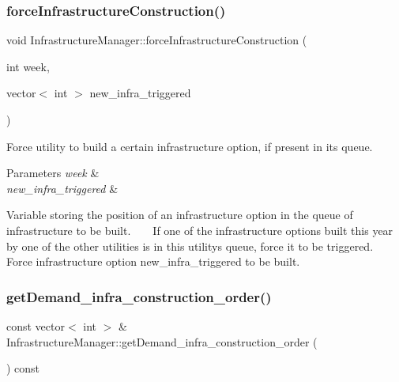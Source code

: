 \mbox{\label{classInfrastructureManager_aaa79bdb84fc23597c4a8b3776dc26f5d}} 
\subsubsection{\texorpdfstring{force\+Infrastructure\+Construction()}{forceInfrastructureConstruction()}}
{\footnotesize\ttfamily void Infrastructure\+Manager\+::force\+Infrastructure\+Construction (\begin{DoxyParamCaption}\item[{int}]{week,  }\item[{vector$<$ int $>$}]{new\+\_\+infra\+\_\+triggered }\end{DoxyParamCaption})}

Force utility to build a certain infrastructure option, if present in its queue. 
\begin{DoxyParams}{Parameters}
{\em week} & \\
\hline
{\em new\+\_\+infra\+\_\+triggered} & \\
\hline
\end{DoxyParams}
Variable storing the position of an infrastructure option in the queue of infrastructure to be built. ~\newline
~\newline
 If one of the infrastructure options built this year by one of the other utilities is in this utility\textquotesingle{}s queue, force it to be triggered. ~\newline
 Force infrastructure option new\+\_\+infra\+\_\+triggered to be built. \mbox{\label{classInfrastructureManager_a5766b6aa0d40f316a6ef57df2dcfa198}} 
\subsubsection{\texorpdfstring{get\+Demand\+\_\+infra\+\_\+construction\+\_\+order()}{getDemand\_infra\_construction\_order()}}
{\footnotesize\ttfamily const vector$<$ int $>$ \& Infrastructure\+Manager\+::get\+Demand\+\_\+infra\+\_\+construction\+\_\+order (\begin{DoxyParamCaption}{ }\end{DoxyParamCaption}) const}

